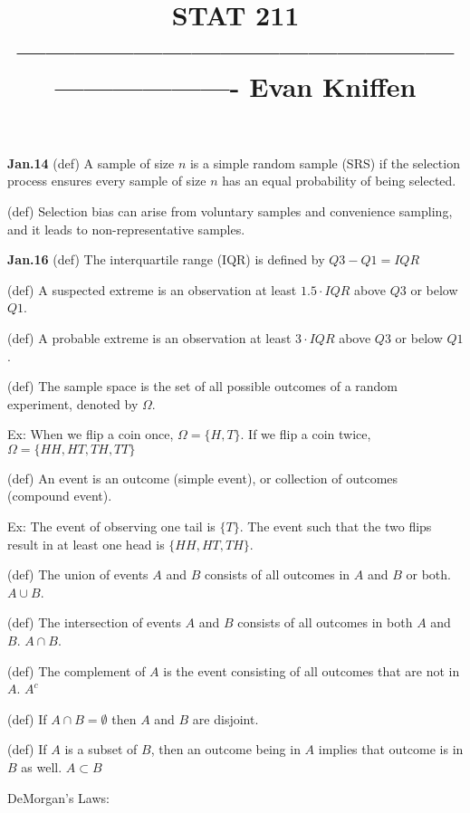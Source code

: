 \documentclass[12pt]{article}
\title{\vspace{-2cm}\large \raggedright STAT 211 ---------------------------------------------------------------- Evan Kniffen}
\date{\vspace{-2cm}} %
\begin{document}
\maketitle
\pagestyle{plain}
\setlength{\parskip}{1em}
\setlength{\parindent}{0em}

\textbf{Jan.14 }
\linebreak
(def) A sample of size \(n\) is a simple random sample (SRS) if the selection process ensures every sample of size \(n\) has an equal probability of being selected. 

(def) Selection bias can arise from voluntary samples and convenience sampling, and it leads to non-representative samples. 

\textbf{Jan.16}
\linebreak
(def) The interquartile range (IQR) is defined by \(Q3-Q1 = IQR\)

(def) A suspected extreme is an observation at least \(1.5\cdot IQR\) above \(Q3\) or below \(Q1\).

(def) A probable extreme is an observation at least \(3\cdot IQR\) above \(Q3\) or below \(Q1\).


(def) The sample space is the set of all possible outcomes of a random experiment, denoted by \(\Omega\). 

Ex: When we flip a coin once, \(\Omega = \{H,T\}\). If we flip a coin twice, \(\Omega = \{HH,HT,TH,TT\}\)

(def) An event is an outcome (simple event), or collection of outcomes (compound event).

Ex: The event of observing one tail is \(\{T\}\). The event such that the two flips result in at least one head is \(\{HH,HT,TH\}\).

(def) The union of events \(A\) and \(B\) consists of all outcomes in \(A\) and \(B\) or both. \(A\cup B\).

(def) The intersection of events \(A\) and \(B\) consists of all outcomes in both \(A\) and \(B\). \(A\cap B\).

(def) The complement of \(A\) is the event consisting of all outcomes that are not in \(A\). \(A^c\)

(def) If \(A\cap B = \emptyset\) then \(A\) and \(B\) are disjoint.

(def) If \(A\) is a subset of \(B\), then an outcome being in \(A\) implies that outcome is in \(B\) as well. \(A \subset B\)

DeMorgan's Laws:
\end{document}
